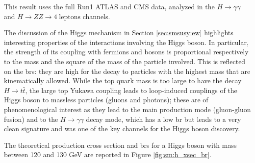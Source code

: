 \noindent This result uses the full Run1 ATLAS and CMS data, analyzed in the $H \rightarrow \gamma \gamma$ and $H \rightarrow ZZ \rightarrow 4 \; \mathrm{leptons}$ channels.


The discussion of the Higgs mechanism in Section \ref{sec:smsusy:ew} highlights interesting properties of the interactions involving the Higgs boson. In particular, the strength of its coupling with fermions and bosons is proportional respectively to the mass and the square of the mass of the particle involved. 
This is reflected on the \glspl{br}: they are high for the decay to particles with the highest mass that are kinematically allowed.
While the top quark mass is too large to have the decay $H \to t\bar{t}$, the large top Yukawa coupling leads to loop-induced couplings of the Higgs boson to massless particles (gluons and photons); these are of phenomenological interest as they lead to the main production mode (gluon-gluon fusion) and to the $H \to \gamma \gamma$ decay mode, which has a low \gls{br} but leads to a very clean signature and was one of the key channels for the Higgs boson discovery. 

The theoretical production cross section and \glspl{br} for a Higgs boson with mass between 120 and 130 GeV are reported in Figure \ref{fig:sm:h_xsec_br}.

